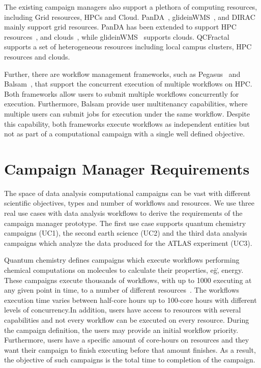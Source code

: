 The existing campaign managers also support a plethora of computing resources, 
including Grid resources, HPCs and Cloud. PanDA~\cite{maeno2008panda}, 
glideinWMS~\cite{sfiligoi2008glidein}, and DIRAC~\cite{casajus2010dirac} 
mainly support grid resources. PanDA has been extended to support HPC 
resources~\cite{de2015future, de2016accelerating}, and 
clouds~\cite{de2016accelerating}, while glideinWMS~\cite{sfiligoi2008glidein} 
supports clouds. QCFractal~\cite{qcfractal} supports a set of heterogeneous 
resources including local campus clusters, HPC resources and clouds.

Further, there are workflow management frameworks, such as 
Pegasus~\cite{deelman2015pegasus} and Balsam~\cite{salim2019balsam}, that 
support the concurrent execution of multiple workflows on HPC. Both frameworks 
allow users to submit multiple workflows concurrently for execution. 
Furthermore, Balsam provide user multitenancy capabilities, where multiple 
users can submit jobs for execution under the same workflow. Despite this 
capability, both frameworks execute workflows as independent entities but not 
as part of a computational campaign with a single well defined objective.

\section{Campaign Manager Requirements}
\label{sec:cm_req}

The space of data analysis computational campaigns can be vast with different 
scientific objectives, types and number of workflows and resources. We use 
three real use cases with data analysis workflows to derive the requirements 
of the campaign manager prototype. The first use case supports quantum 
chemistry campaigns (UC1), the second earth science (UC2) and the third data 
analysis campaigns which analyze the data produced for the ATLAS 
experiment (UC3).

Quantum chemistry defines campaigns which execute workflows performing 
chemical computations on molecules to calculate their properties, e\.g\., 
energy. These campaigns execute thousands of workflows, with up to 1000 
executing at any given point in time, to a number of different 
resources~\cite{smith2020molssi}. The workflows execution time varies between 
half-core hours up to 100-core hours with different levels of concurrency.In 
addition, users have access to resources with several capabilities and not 
every workflow can be executed on every resource. During the campaign 
definition, the users may provide an initial workflow priority. Furthermore, 
users have a specific amount of core-hours on resources and they want their 
campaign to finish executing before that amount finishes. As a result, the 
objective of such campaigns is the total time to completion of the campaign.

